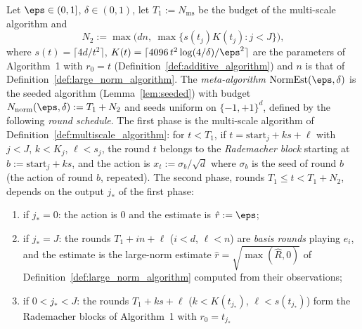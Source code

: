 \begin{definition}\label{def:meta_algorithm}
\leanok
{}
Let $\eps \in (0,1]$, $\delta \in (0,1)$, let $T_1 := N_{\mathrm{ms}}$ be the budget of the
multi-scale algorithm and
\[
  N_2 := \max\big( dn,\ \max\{ s(t_j)K(t_j) : j < J \} \big),
\]
where $s(t) = \lceil 4d/t^2\rceil$, $K(t) = \lceil 4096\,t^2\log(4/\delta)/\eps^2\rceil$ are the
parameters of Algorithm~1 with $r_0 = t$ (Definition~\ref{def:additive_algorithm}) and $n$
is that of Definition~\ref{def:large_norm_algorithm}. The \emph{meta-algorithm}
$\mathrm{NormEst}(\eps,\delta)$ is the seeded algorithm (Lemma~\ref{lem:seeded}) with budget
$N_{\mathrm{norm}}(\eps,\delta) := T_1 + N_2$ and seeds uniform on $\{-1,+1\}^d$, defined by the
following \emph{round schedule}. The first phase is the multi-scale algorithm of
Definition~\ref{def:multiscale_algorithm}: for $t < T_1$, if $t = \mathrm{start}_j + ks + \ell$
with $j < J$, $k < K_j$, $\ell < s_j$, the round $t$ belongs to the \emph{Rademacher block}
starting at $b := \mathrm{start}_j + ks$, and the action is $x_t := \sigma_b/\sqrt d$ where
$\sigma_b$ is the seed of round $b$ (the action of round $b$, repeated). The second phase,
rounds $T_1 \le t < T_1 + N_2$, depends on the output $j_*$ of the first phase:
\begin{enumerate}
  \item[(a)] if $j_* = 0$: the action is $0$ and the estimate is $\hat r := \eps$;
  \item[(b)] if $j_* = J$: the rounds $T_1 + in + \ell$ ($i < d$, $\ell < n$) are
        \emph{basis rounds} playing $e_i$, and the estimate is the large-norm estimate
        $\hat r = \sqrt{\max(\hat R, 0)}$ of Definition~\ref{def:large_norm_algorithm} computed
        from their observations;
  \item[(c)] if $0 < j_* < J$: the rounds $T_1 + ks + \ell$ ($k < K(t_{j_*})$,
        $\ell < s(t_{j_*})$) form the Rademacher blocks of Algorithm~1 with $r_0 = t_{j_*}$

\end{enumerate}
\end{definition}
